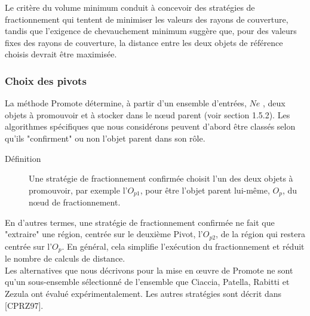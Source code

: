 Le critère du volume minimum conduit à concevoir des stratégies de fractionnement qui tentent de minimiser les valeurs des rayons de couverture, tandis que l'exigence de chevauchement minimum suggère que, pour des valeurs fixes des rayons de couverture, la distance entre les deux objets de référence choisis devrait être maximisée.

\subsubsection{Choix des pivots}
La méthode Promote détermine, à partir d'un ensemble d'entrées, $ Ne $ , deux objets à promouvoir et à stocker dans le nœud parent (voir section 1.5.2). Les algorithmes spécifiques que nous considérons peuvent d'abord être classés selon qu'ils "confirment" ou non l'objet parent dans son rôle.

\begin{description}
	\item[Définition]  Une stratégie de fractionnement confirmée choisit l'un des deux objets à promouvoir, par exemple l'$ O_{p1} $, pour être l'objet parent lui-même, $ O_p $, du nœud de fractionnement.
\end{description}

En d'autres termes, une stratégie de fractionnement confirmée ne fait que "extraire" une région, centrée sur le deuxième Pivot, l'$ O_{p2} $, de la région qui restera centrée sur l'$ O_p $. En général, cela simplifie l'exécution du fractionnement et réduit le nombre de calculs de distance.\\

Les alternatives que nous décrivons pour la mise en œuvre de Promote ne sont qu'un sous-ensemble sélectionné de l'ensemble que Ciaccia, Patella, Rabitti et Zezula ont évalué expérimentalement. Les autres stratégies sont décrit dans [CPRZ97].

